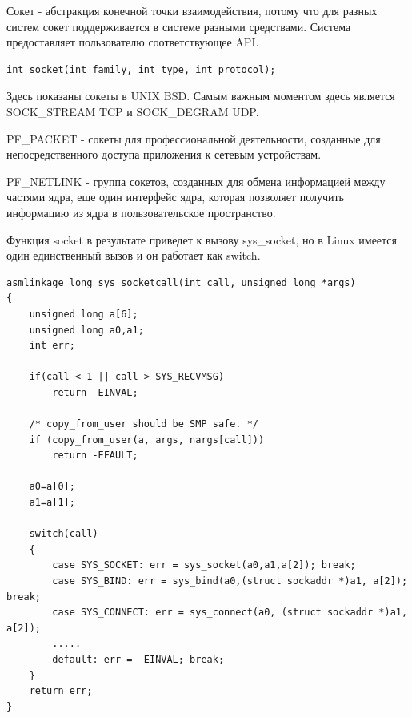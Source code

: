 \documentclass[12pt,a4paper]{scrreprt}
\begin{document}
Сокет - абстракция конечной точки взаимодействия, потому что для разных систем сокет поддерживается в системе разными средствами. Система предоставляет пользователю соответствующее API. 

\begin{lstlisting}
int socket(int family, int type, int protocol);
\end{lstlisting}

\begin{figure}[!h]
\end{figure}

Здесь показаны сокеты в UNIX BSD. Самым важным моментом здесь является SOCK\_STREAM TCP и SOCK\_DEGRAM UDP. 

PF\_PACKET - сокеты для профессиональной деятельности, созданные для непосредственного доступа приложения к сетевым устройствам. 

PF\_NETLINK - группа сокетов, созданных для обмена информацией между частями ядра, еще один интерфейс ядра, которая позволяет получить информацию из ядра в пользовательское пространство.

Функция socket в результате приведет к вызову sys\_socket, но в Linux имеется один единственный вызов и он работает как switch.

\begin{lstlisting}
asmlinkage long sys_socketcall(int call, unsigned long *args)
{
	unsigned long a[6];
	unsigned long a0,a1;
	int err;
	
	if(call < 1 || call > SYS_RECVMSG)
		return -EINVAL;
	
	/* copy_from_user should be SMP safe. */
	if (copy_from_user(a, args, nargs[call]))
		return -EFAULT;
	
	a0=a[0];
	a1=a[1];
	
	switch(call) 
	{
		case SYS_SOCKET: err = sys_socket(a0,a1,a[2]); break;
		case SYS_BIND: err = sys_bind(a0,(struct sockaddr *)a1, a[2]); break;
		case SYS_CONNECT: err = sys_connect(a0, (struct sockaddr *)a1, a[2]);
		.....
		default: err = -EINVAL; break;
	}
	return err;
}
\end{lstlisting}
\end{document}

